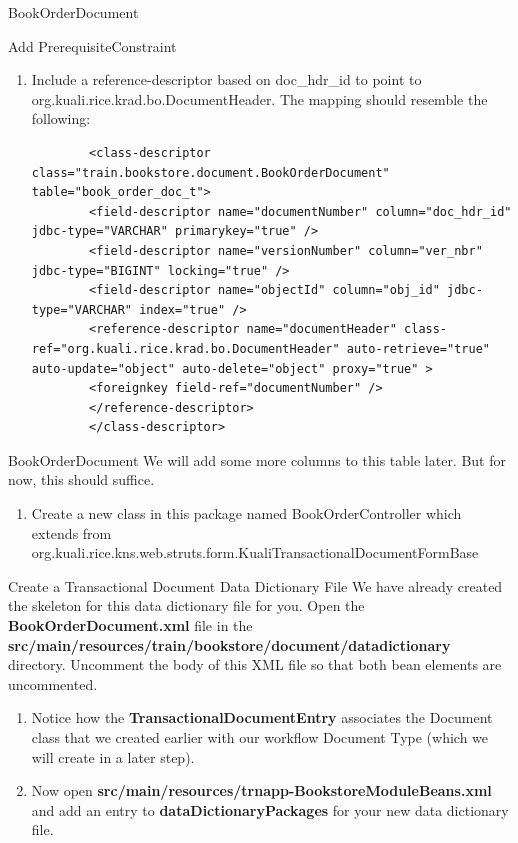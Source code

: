 \documentclass[xcolor=dvipsnames,14pt,professionalfonts]{beamer}
\begin{document}
\begin{frame}{BookOrderDocument}
\begin{enumerate}
\begin{frame}[fragile]{Add PrerequisiteConstraint}
\begin{enumerate}
    \item Include a reference-descriptor based on doc_hdr_id to point to org.kuali.rice.krad.bo.DocumentHeader.
      The mapping should resemble the following:
      \begin{verbatim}
        <class-descriptor class="train.bookstore.document.BookOrderDocument" table="book_order_doc_t">
        <field-descriptor name="documentNumber" column="doc_hdr_id" jdbc-type="VARCHAR" primarykey="true" />
        <field-descriptor name="versionNumber" column="ver_nbr" jdbc-type="BIGINT" locking="true" />
        <field-descriptor name="objectId" column="obj_id" jdbc-type="VARCHAR" index="true" />
        <reference-descriptor name="documentHeader" class-ref="org.kuali.rice.krad.bo.DocumentHeader" auto-retrieve="true" auto-update="object" auto-delete="object" proxy="true" >
       	<foreignkey field-ref="documentNumber" />
        </reference-descriptor>
        </class-descriptor>
      \end{verbatim}
    \end{enumerate}
\end{frame}

\begin{frame}{BookOrderDocument}
We will add some more columns to this table later.  But for now, this should suffice.
\begin{enumerate}
\item  Create a new class in this package named BookOrderController which
  extends from
  org.kuali.rice.kns.web.struts.form.KualiTransactionalDocumentFormBase
\end{enumerate}
\end{frame}

\begin{frame}{Create a Transactional Document Data Dictionary File}
We have already created the skeleton for this data dictionary file for you.  Open the \textbf{BookOrderDocument.xml} file in the \textbf{src/main/resources/train/bookstore/document/datadictionary} directory.
Uncomment the body of this XML file so that both bean elements are uncommented.
\begin{enumerate} 
\item Notice how the \textbf{TransactionalDocumentEntry} associates the Document class that we created earlier with our workflow Document Type (which we will create in a later step).
\item Now open
  \textbf{src/main/resources/trnapp-BookstoreModuleBeans.xml} and add
  an entry to \textbf{dataDictionaryPackages} for your new data
  dictionary file.
\end{enumerate}



\end{frame}
\end{enumerate}
\end{frame}
\end{document}
